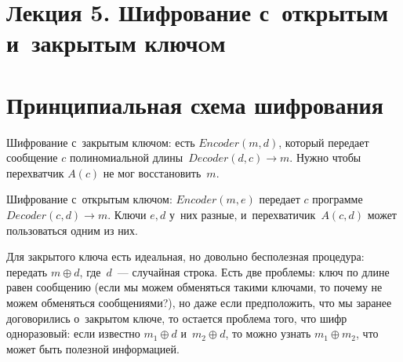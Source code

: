 \documentclass{article}
\begin{document}
\section*{Лекция 5. Шифрование с~открытым и~закрытым ключoм}
\resetcntrs

\section{Принципиальная схема шифрования}

Шифрование с~закрытым ключом: есть $Encoder(m, d)$, который передает сообщение
$c$ полиномиальной длины~$Decoder(d, c) \rightarrow m$. Нужно чтобы перехватчик
$A(c)$ не мог восстановить~$m$.

Шифрование с~открытым ключом: $Encoder(m, e)$ передает $c$ программе $Decoder(c,
d) \rightarrow m$. Ключи $e, d$ у~них разные, и~перехватичик~$A(c, d)$ может
пользоваться одним из них.

Для закрытого ключа есть идеальная, но довольно бесполезная процедура: передать
$m \oplus d$, где~$d$~--- случайная строка. Есть две проблемы: ключ по длине
равен сообщению (если мы можем обменяться такими ключами, то почему не можем
обменяться сообщениями?), но даже если предположить, что мы заранее договорились
о~закрытом ключе, то остается проблема того, что шифр одноразовый: если известно
$m_1 \oplus d$ и~$m_2 \oplus d$, то можно узнать $m_1 \oplus m_2$, что может
быть полезной информацией.
\end{document}
